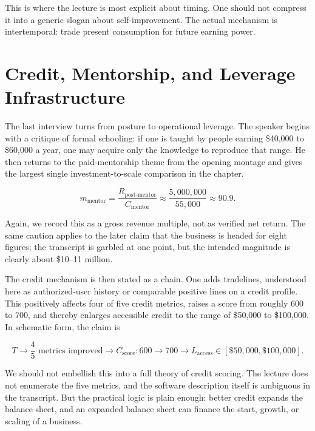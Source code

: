 This is where the lecture is most explicit about timing. One should not compress it into a generic slogan about self-improvement. The actual mechanism is intertemporal: trade present consumption for future earning power.

\section{Credit, Mentorship, and Leverage Infrastructure}

The last interview turns from posture to operational leverage. The speaker begins with a critique of formal schooling: if one is taught by people earning \$40{,}000 to \$60{,}000 a year, one may acquire only the knowledge to reproduce that range. He then returns to the paid-mentorship theme from the opening montage and gives the largest single investment-to-scale comparison in the chapter.

\begin{equation}
m_{\text{mentor}}
=
\frac{R_{\text{post-mentor}}}{C_{\text{mentor}}}
\approx
\frac{5{,}000{,}000}{55{,}000}
\approx 90.9.
\end{equation}

Again, we record this as a gross revenue multiple, not as verified net return. The same caution applies to the later claim that the business is headed for eight figures; the transcript is garbled at one point, but the intended magnitude is clearly about \$10--11 million.

The credit mechanism is then stated as a chain. One adds tradelines, understood here as authorized-user history or comparable positive lines on a credit profile. This positively affects four of five credit metrics, raises a score from roughly \(600\) to \(700\), and thereby enlarges accessible credit to the range of \$50{,}000 to \$100{,}000. In schematic form, the claim is

\begin{equation}
T
\longrightarrow
\frac{4}{5}\text{ metrics improved}
\longrightarrow
C_{\text{score}}:600\to700
\longrightarrow
L_{\text{access}}\in[\$50{,}000,\$100{,}000].
\end{equation}

We should not embellish this into a full theory of credit scoring. The lecture does not enumerate the five metrics, and the software description itself is ambiguous in the transcript. But the practical logic is plain enough: better credit expands the balance sheet, and an expanded balance sheet can finance the start, growth, or scaling of a business.

